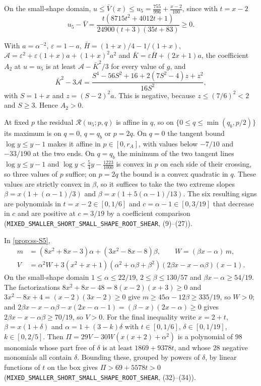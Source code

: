  On the small-shape domain, $u\le\bar V(x)\le u_5=\frac{755}{996}+
\frac{x-2}{100}$, since with $t=x-2$
\[
  u_5-\bar V=\frac{t(8715t^2+4012t+1)}{24900(t+3)(35t+83)}\ge0 .
\]

 With $a=\alpha^{-2}$, $\varepsilon=1-a$,
$\bar H=(1+x)/4-1/(1+x)$, $\mathcal A=\varepsilon^2+\varepsilon(1+x)a+(1+x)^2a^2$ and
$\bar K=\varepsilon\bar H+(2x+1)a$, the coefficient $A_2$ at $u=u_5$ is at least
$\mathcal A-\bar K^2/3$ for every value of $g$, and
\[
  \bar K^2-3\mathcal A=\frac{S^4-56S^2+16+2(7S^2-4)z+z^2}{16S^2},
\]
with $S=1+x$ and $z=(S-2)^2a$. This is negative, because $z\le(7/6)^2<2$ and $S\ge3$. Hence
$A_2>0$.

 At fixed $p$ the residual $\mathcal R(u_5;p,q)$ is
affine in $q$, so on $\{0\le q\le\min(q_b,p/2)\}$ its maximum is on $q=0$, $q=q_b$ or $p=2q$. On
$q=0$ the tangent bound $\log y\le y-1$ makes it affine in $p\in[0,r_A]$, with values below
$-7/10$ and $-33/190$ at the two ends. On $q=q_b$ the minimum of the two tangent lines
$\log y\le y-1$ and $\log y<\frac54y-\frac{1223}{1000}$ is convex in $p$ on each side of their
crossing, so three values of $p$ suffice; on $p=2q$ the bound is a convex quadratic in $q$. These
values are strictly convex in $\beta$, so it suffices to take the two extreme slopes
$\beta=x(1+(\alpha-1)/3)$ and $\beta=x(1+5(\alpha-1)/13)$. The six resulting signs are
polynomials in $t=x-2\in[0,1/6]$ and $c=\alpha-1\in[0,3/19]$ that decrease in $c$ and are
positive at $c=3/19$ by a coefficient comparison~\cite{Notes}
(\texttt{MIXED\_SMALLER\_SHORT\_SMALL\_SHAPE\_ROOT\_SHEAR}, (9)--(27)).

 In \cref{prop:ss-S5},
\begin{align*}
  m&=(8x^2+8x-3)\alpha+(3x^2-8x-8)\beta,\qquad W=(\beta x-\alpha)\,m,\\
  V&=\alpha^2W+3(x^2+x+1)(\alpha^2+\alpha\beta+\beta^2)(2\beta x-x-\alpha\beta)(x-1).
\end{align*}
On the small-shape domain $1\le\alpha\le22/19$, $2\le\beta\le130/57$ and $\beta x-\alpha\ge54/19$.
The factorizations $8x^2+8x-48=8(x-2)(x+3)\ge0$ and $3x^2-8x+4=(x-2)(3x-2)\ge0$ give
$m\ge45\alpha-12\beta\ge335/19$, so $W>0$; and $2\beta x-x-\alpha\beta-x(2x-\alpha-1)=
(\beta-x)(2x-\alpha)\ge0$ gives $2\beta x-x-\alpha\beta\ge70/19$, so $V>0$. For the final
inequality write $x=2+t$, $\beta=x(1+\delta)$ and $\alpha=1+(3-k)\delta$ with $t\in[0,1/6]$,
$\delta\in[0,1/19]$, $k\in[0,2/5]$. Then $\Pi=29V-30W(x(x+2)+\alpha^2)$ is a polynomial of $98$
monomials whose part free of $\delta$ is at least $1869+9378t$, and whose $28$ negative monomials
all contain $\delta$. Bounding these, grouped by powers of $\delta$, by linear functions of $t$ on
the box gives $\Pi>69+5578t>0$~\cite{Notes}
(\texttt{MIXED\_SMALLER\_SHORT\_SMALL\_SHAPE\_ROOT\_SHEAR}, (32)--(34)).

